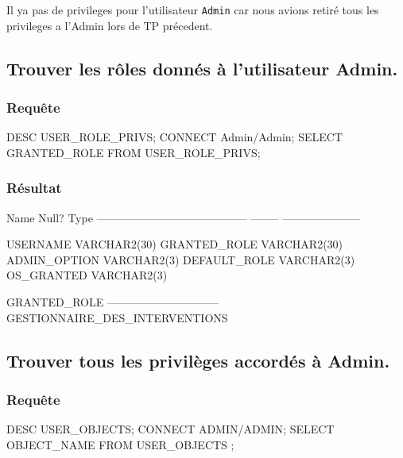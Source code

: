 \documentclass[•]{article}
\begin{document}
Il ya pas de privileges pour l'utilisateur \texttt{Admin} car nous avions retiré tous les privileges a l'Admin lors de TP précedent.

\subsection{Trouver les rôles donnés à l’utilisateur Admin.}
\subsubsection{Requête}
\begin{sql}
DESC USER_ROLE_PRIVS;
CONNECT Admin/Admin;
SELECT GRANTED_ROLE FROM USER_ROLE_PRIVS;
\end{sql}
\subsubsection{Résultat}
\begin{sql}
 Name                                      Null?    Type
 ----------------------------------------- -------- ---------------------

 USERNAME                                           VARCHAR2(30)
 GRANTED_ROLE                                       VARCHAR2(30)
 ADMIN_OPTION                                       VARCHAR2(3)
 DEFAULT_ROLE                                       VARCHAR2(3)
 OS_GRANTED                                         VARCHAR2(3)

GRANTED_ROLE
------------------------------
GESTIONNAIRE_DES_INTERVENTIONS
 \end{sql}

\subsection{Trouver tous les privilèges accordés à Admin.}
\subsubsection{Requête}
\begin{sql}
DESC USER_OBJECTS;
CONNECT ADMIN/ADMIN;
SELECT OBJECT_NAME FROM USER_OBJECTS ;
\end{sql}
\end{document}
